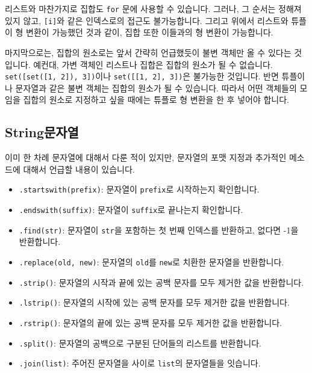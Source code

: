 \documentclass[../main.tex]{subfiles}
\begin{document}
리스트와 마찬가지로 집합도 \texttt{for} 문에 사용할 수 있습니다.
그러나, 그 순서는 정해져 있지 않고, \texttt{[i]}와 같은 인덱스로의 접근도 불가능합니다.
그리고 위에서 리스트와 튜플이 형 변환이 가능했던 것과 같이, 집합 또한 이들과의 형 변환이 가능합니다.

마지막으로는, 집합의 원소로는 앞서 간략히 언급했듯이 불변 객체만 올 수 있다는 것입니다.
예컨대, 가변 객체인 리스트나 집합은 집합의 원소가 될 수 없습니다.
\texttt{set([set([1, 2]), 3])}이나 \texttt{set([[1, 2], 3])}은 불가능한 것입니다.
반면 튜플이나 문자열과 같은 불변 객체는 집합의 원소가 될 수 있습니다.
따라서 어떤 객체들의 모임을 집합의 원소로 지정하고 싶을 때에는 튜플로 형 변환을 한 후 넣어야 합니다.

\subsection{String문자열}
이미 한 차례 문자열에 대해서 다룬 적이 있지만, 문자열의 포맷 지정과 추가적인 메소드에 대해서 언급할 내용이 있습니다.
\begin{itemize}
    \item \texttt{.startswith(prefix)}: 문자열이 \texttt{prefix}로 시작하는지 확인합니다.
    \item \texttt{.endswith(suffix)}: 문자열이 \texttt{suffix}로 끝나는지 확인합니다.
    \item \texttt{.find(str)}: 문자열이 \texttt{str}을 포함하는 첫 번째 인덱스를 반환하고, 없다면 -1을 반환합니다.
    \item \texttt{.replace(old, new)}: 문자열의 \texttt{old}를 \texttt{new}로 치환한 문자열을 반환합니다.
    \item \texttt{.strip()}: 문자열의 시작과 끝에 있는 공백 문자를 모두 제거한 값을 반환합니다.
    \item \texttt{.lstrip()}: 문자열의 시작에 있는 공백 문자를 모두 제거한 값을 반환합니다.
    \item \texttt{.rstrip()}: 문자열의 끝에 있는 공백 문자를 모두 제거한 값을 반환합니다.
    \item \texttt{.split()}: 문자열의 공백으로 구분된 단어들의 리스트를 반환합니다.
    \item \texttt{.join(list)}: 주어진 문자열을 사이로 \texttt{list}의 문자열들을 잇습니다.
\end{itemize}
\end{document}
